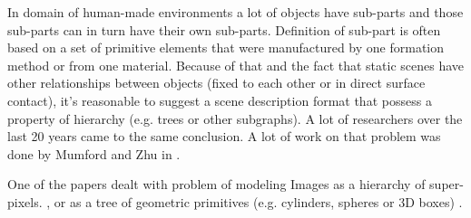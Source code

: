 

%


In domain of human-made environments a lot of objects have sub-parts and those sub-parts can in turn have their own sub-parts. Definition of sub-part is often based on a set of primitive elements that were manufactured by one formation method or from one material. Because of that and the fact that static scenes have other relationships between objects (fixed to each other or in direct surface contact), it's reasonable to suggest a scene description format that possess a property of hierarchy (e.g. trees or other subgraphs).
A lot of researchers over the last 20 years came to the same conclusion. A lot of work on that problem was done by Mumford and Zhu in \cite{zhu2006stochastic}.

One of the papers dealt with problem of modeling Images as a hierarchy of super-pixels. \cite{russell2009associative}, or as a tree of geometric primitives (e.g. cylinders, spheres or 3D boxes) \cite{li2017grass}.





